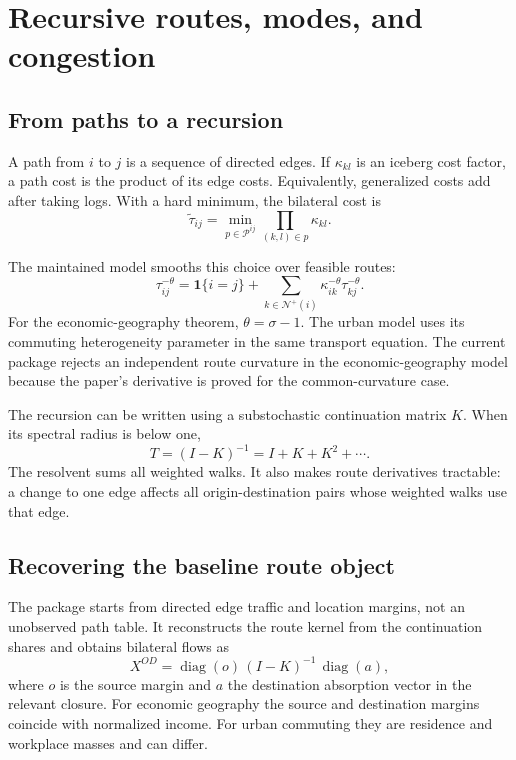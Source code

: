 \chapter{Recursive routes, modes, and congestion}
\label{ch:routing}

\section{From paths to a recursion}

A path from \(i\) to \(j\) is a sequence of directed edges. If
\(\kappa_{kl}\) is an iceberg cost factor, a path cost is the product of its
edge costs. Equivalently, generalized costs add after taking logs. With a hard
minimum, the bilateral cost is
\[
 \widetilde\tau_{ij}
 =\min_{p\in\mathcal P^{ij}}\prod_{(k,l)\in p}\kappa_{kl}.
\]

The maintained model smooths this choice over feasible routes:
\[
 \tau_{ij}^{-\theta}
 =\mathbf 1\{i=j\}
  +\sum_{k\in\mathcal N^+(i)}
    \kappa_{ik}^{-\theta}\tau_{kj}^{-\theta}.
\]
For the economic-geography theorem, \(\theta=\sigma-1\). The urban model uses
its commuting heterogeneity parameter in the same transport equation. The
current package rejects an independent route curvature in the
economic-geography model because the paper's derivative is proved for the
common-curvature case.

The recursion can be written using a substochastic continuation matrix \(K\).
When its spectral radius is below one,
\[
 T=(I-K)^{-1}=I+K+K^2+\cdots.
\]
The resolvent sums all weighted walks. It also makes route derivatives
tractable: a change to one edge affects all origin-destination pairs whose
weighted walks use that edge.

\section{Recovering the baseline route object}

The package starts from directed edge traffic and location margins, not an
unobserved path table. It reconstructs the route kernel from the continuation
shares and obtains bilateral flows as
\[
 X^{OD}=\operatorname{diag}(o)\,
        (I-K)^{-1}\,
        \operatorname{diag}(a),
\]
where \(o\) is the source margin and \(a\) the destination absorption vector
in the relevant closure. For economic geography the source and destination
margins coincide with normalized income. For urban commuting they are
residence and workplace masses and can differ.

